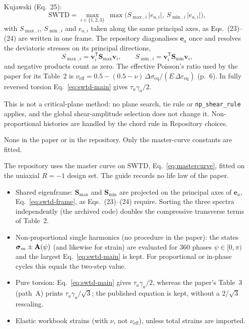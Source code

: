  Kujawski (Eq.~25):
\begin{equation}
\mathrm{SWTD} = \max_{i\in\{1,2,3\}}\ \max\bigl(S_{\max,i}\,\lvert e_{a,i}\rvert,\ S_{\min,i}\,\lvert e_{a,i}\rvert\bigr) ,
\label{eq:swtd-main}
\end{equation}
with $S_{\max,i}$, $S_{\min,i}$ and $e_{a,i}$ taken along the same principal axes, as Eqs.~(23)--(24)
are written in one frame. The repository diagonalises $\mathbf e_a$ once and resolves the deviatoric
stresses on its principal directions,
\begin{equation}
S_{\max,i} = \mathbf v_i^{\mathsf T}\mathbf S_{\max}\mathbf v_i ,\qquad
S_{\min,i} = \mathbf v_i^{\mathsf T}\mathbf S_{\min}\mathbf v_i ,
\label{eq:swtd-frame}
\end{equation}
and negative products count as zero. The effective Poisson's ratio used by the paper for its
Table~2 is $\nu_\text{eff}=0.5-(0.5-\nu)\,\Delta\sigma_\text{eq}/(E\,\Delta\varepsilon_\text{eq})$
(p.~6). In fully reversed torsion Eq.~\eqref{eq:swtd-main} gives $\tau_a\gamma_a/2$.

This is not a critical-plane method: no plane search, tie rule or \texttt{np\_shear\_rule}
applies, and the global shear-amplitude selection does not change it. Non-proportional histories
are handled by the chord rule in Repository choices.

 None in the paper or in the repository. Only the master-curve
constants are fitted.

 The repository uses the master curve on SWTD, Eq.~\eqref{eq:mastercurve}, fitted on
the uniaxial $R=-1$ design set. The guide records no life law of the paper.

\begin{itemize}
\item Shared eigenframe: $\mathbf S_{\max}$ and $\mathbf S_{\min}$ are projected on the principal
  axes of $\mathbf e_a$, Eq.~\eqref{eq:swtd-frame}, as Eqs.~(23)--(24) require. Sorting the
  three spectra independently (the archived code) doubles the compressive transverse terms of
  Table~2.
\item Non-proportional single harmonics (no procedure in the paper): the states
  $\boldsymbol\sigma_m\pm\mathbf A(\psi)$ (and likewise for strain) are evaluated for 360 phases
  $\psi\in[0,\pi)$ and the largest Eq.~\eqref{eq:swtd-main} is kept. For proportional or in-phase
  cycles this equals the two-step value.
\item Pure torsion: Eq.~\eqref{eq:swtd-main} gives $\tau_a\gamma_a/2$, whereas the paper's Table~3
  (path~A) prints $\tau_a\gamma_a/\sqrt3$; the published equation is kept, without a $2/\sqrt3$
  rescaling.
\item Elastic workbook strains (with $\nu$, not $\nu_\text{eff}$), unless total strains are imported.
\end{itemize}

